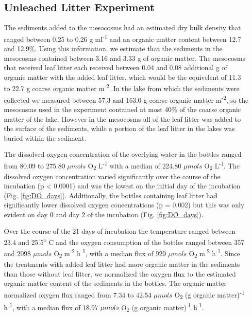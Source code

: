 \subsection{Unleached Litter Experiment}
The sediments added to the mesocosms had an estimated dry bulk density that ranged between 0.25 to 0.26 g ml\textsuperscript{-1} and an organic matter content between 12.7 and 12.9\%. Using this information, we estimate that the sediments in the mesocosms contained between 3.16 and 3.33 g of organic matter.  The mesocosms that received leaf litter each received between 0.04 and 0.08 additional g of organic matter with the added leaf litter, which would be the equivelent of 11.3 to 22.7 g coarse organic matter m\textsuperscript{-2}. In the lake from which the sediments were collected we measured between 57.3 and 163.0 g coarse organic matter m\textsuperscript{-2}, so the mesocosms used in the experiment contained at most 40\% of the coarse organic matter of the lake. However in the mesocosms all of the leaf litter was added to the surface of the sediments, while a portion of the leaf litter in the lakes was buried within the sediment.

The dissolved oxygen concentration of the overlying water in the bottles ranged from 80.09 to 275.80 $\mu mols$ O\textsubscript{2} L\textsuperscript{-1} with a median of 224.80 $\mu mols$ O\textsubscript{2} L\textsuperscript{-1}.  The dissolved oxygen concentration varied significantly over the course of the incubation (p < 0.0001) and was the lowest on the initial day of the incubation (Fig. \ref{fig:DO_days}). Additionally, the bottles containing leaf litter had significantly lower dissolved oxygen concentrations (p = 0.002) but this was only evident on day 0 and day 2 of the incubation (Fig. \ref{fig:DO_days}).

Over the course of the 21 days of incubation the temperature ranged between 23.4 and 25.5\textsuperscript{o} C and the oxygen consumption of the bottles ranged between 357 and 2098 $\mu mols$ O\textsubscript{2} m\textsuperscript{-2} h\textsuperscript{-1}, with a median flux of 920 $\mu mols$ O\textsubscript{2} m\textsuperscript{-2} h\textsuperscript{-1}. Since the treatments with added leaf litter had more organic matter in the sediments than those without leaf litter, we normalized the oxygen flux to the estimated organic matter content of the sediments in the bottles. The organic matter normalized oxygen flux ranged from 7.34 to 42.54 $\mu mols$ O\textsubscript{2} (g organic matter)\textsuperscript{-1} h\textsuperscript{-1}, with a median flux of 18.97 $\mu mols$ O\textsubscript{2} (g organic matter)\textsuperscript{-1} h\textsuperscript{-1}.


